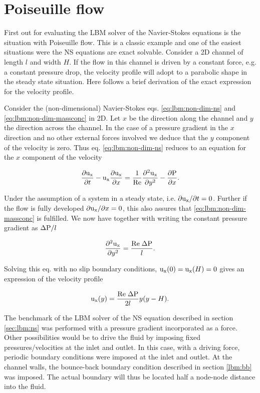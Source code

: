 \section{Poiseuille flow}
First out for evaluating the LBM solver of the Navier-Stokes equations
is the situation with Poiseuille flow. This is a classic example and
one of the easiest situations were the NS equations are exact
solvable. Consider a 2D channel of length $l$ and width $H$. If the
flow in this channel is driven by a constant force, e.g. a constant
pressure drop, the velocity profile will adopt to a parabolic shape in
the steady state situation. Here follows a brief derivation of the
exact expression for the velocity profile.

Consider the (non-dimensional) Navier-Stokes
eqs. \eqref{eq:lbm:non-dim-ns} and \eqref{eq:lbm:non-dim-massconc} in
2D. Let $x$ be the direction along the channel and $y$ the direction
across the channel. In the case of a pressure gradient in the $x$
direction and no other external forces involved we deduce that the $y$
component of the velocity is zero. Thus eq. \eqref{eq:lbm:non-dim-ns}
reduces to an equation for the $x$ component of the velocity

\begin{equation}
\dfrac{\partial \mathrm{u_x}}{\partial t} - \mathrm{u_x} \dfrac{\partial \mathrm{u_x}}{\partial
  x} = \frac{1}{\mathrm{Re}} \dfrac{\partial^2 \mathrm{u_x}}{\partial y^2} -
\dfrac{\partial \mathrm{P}}{\partial x}.
\end{equation}
 
Under the assumption of a system in a steady state, i.e. ${\partial
  \mathrm{u_x}}/{\partial t} = 0$. Further if the flow is fully developed
${\partial \mathrm{u_x}}/{\partial x} = 0$, this also assures that
\eqref{eq:lbm:non-dim-massconc} is fulfilled. We now have together
with writing the constant pressure gradient as $\Delta \mathrm{P}/l$

\begin{equation}
\dfrac{\partial^2 \mathrm{u_x}}{\partial y^2} =
\dfrac{\mathrm{Re}\; \Delta\mathrm{P}}{l}.
\end{equation}

Solving this eq. with no slip boundary conditions, $\mathrm{u_x}(0) = \mathrm{u_x}(H) =
0$ gives an expression of the velocity profile

\begin{equation}\label{fig:mb:ana_poi}
\mathrm{u_x}(y) = \dfrac{\mathrm{Re}\; \Delta\mathrm{P}}{2l}y(y - H).
\end{equation}

The benchmark of the LBM solver of the NS equation described in
section \ref{sec:lbm:ns} was performed with a pressure gradient
incorporated as a force. Other possibilities would be to drive the
fluid by imposing fixed pressures/velocities at the inlet and outlet.
In this case, with a driving force, periodic boundary conditions were
imposed at the inlet and outlet. At the channel walls, the bounce-back
boundary condition described in section \ref{lbm:bb} was imposed. The
actual boundary will thus be located half a node-node distance into
the fluid.

